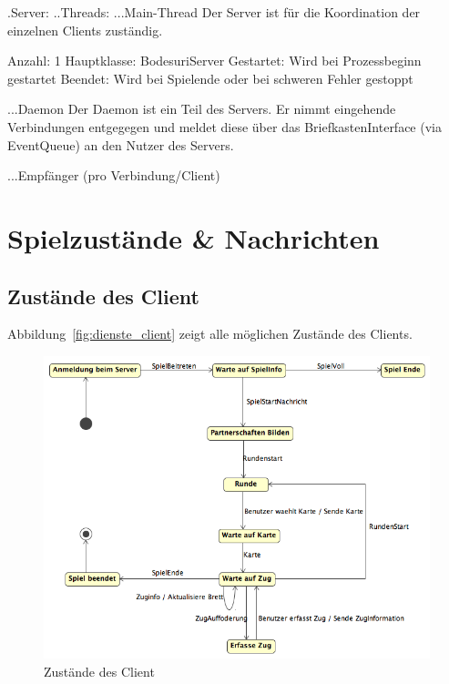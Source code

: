 \documentclass[12pt,halfparskip]{scrartcl}
\begin{document}
.Server: 
..Threads:
...Main-Thread
Der Server ist für die Koordination der einzelnen Clients zuständig.

Anzahl: 1
Hauptklasse: BodesuriServer
Gestartet: Wird bei Prozessbeginn gestartet
Beendet: Wird bei Spielende oder bei schweren Fehler gestoppt

...Daemon
Der Daemon ist ein Teil des Servers. Er nimmt eingehende Verbindungen entgegegen und meldet diese über das BriefkastenInterface (via EventQueue) an den Nutzer des Servers.




...Empfänger (pro Verbindung/Client)




\clearpage
\section{Spielzustände \& Nachrichten} %
\label{spielzustaende_nachrichten}
\subsection{Zustände des Client} %
\label{sub:zustände_des_client}
Abbildung~\vref{fig:dienste_client} zeigt alle möglichen Zustände des Clients.
\begin{figure}[h]
	\centering
	\includegraphics[width=\textwidth]{dienste_client}
	\caption{Zustände des Client}
	\label{fig:dienste_client}
\end{figure}
\end{document}
